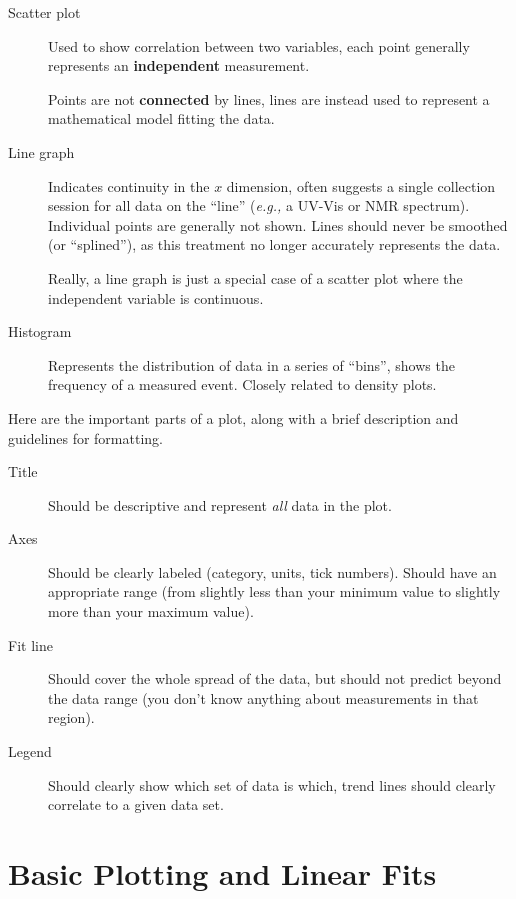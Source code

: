 \documentclass[nobib,nofonts,nols,nohyper]{tufte-handout}
\begin{document}
\begin{description}
	\item[Scatter plot] Used to show correlation between two variables, each point generally represents an \textbf{independent} measurement. 
	
	Points are not \textbf{connected} by lines, lines are instead used to represent a mathematical model fitting the data.
	
	\item[Line graph] Indicates continuity in the \( x \) dimension, often suggests a single collection session for all data on the ``line'' (\emph{e.g.,} a UV-Vis or NMR spectrum).
	Individual points are generally not shown.  
	Lines should never be smoothed (or ``splined''), as this treatment no longer accurately represents the data. 
	
	Really, a line graph is just a special case of a scatter plot where the independent variable is continuous. 

	\item[Histogram] Represents the distribution of data in a series of ``bins'', shows the frequency of a measured event. 
	Closely related to density plots. 
\end{description}

Here are the important parts of a plot, along with a brief description and guidelines for formatting.

\begin{description}
	\item[Title] Should be descriptive and represent \emph{all} data in the plot.
	\item[Axes] Should be clearly labeled (category, units, tick numbers). 
	Should have an appropriate range (from slightly less than your minimum value to slightly more than your maximum value).
	\item[Fit line] Should cover the whole spread of the data, but should not predict beyond the data range (you don't know anything about measurements in that region).
	\item[Legend] Should clearly show which set of data is which, trend lines should clearly correlate to a given data set.
\end{description}


\section{Basic Plotting and Linear Fits} %
\label{basic-plotting-and-linear-fits}
\end{document}
